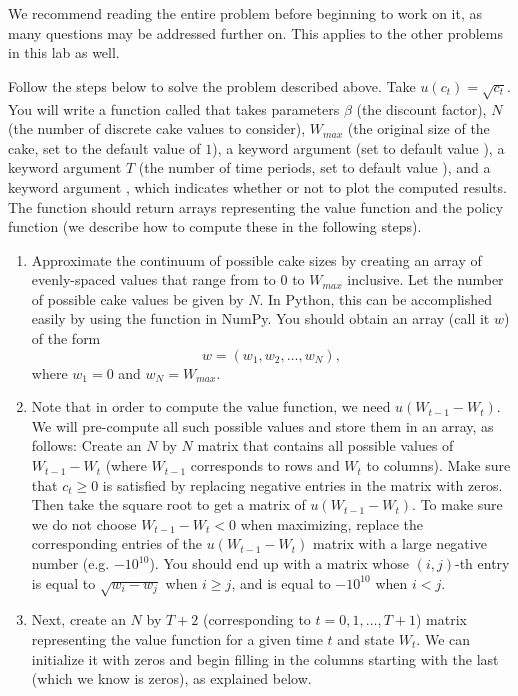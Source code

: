 \begin{problem}
\label{prob:cake_prob}
We recommend reading the entire problem before beginning to work on it, as many questions may be addressed further on.  This applies to the other problems in this lab as well.

Follow the steps below to solve the problem described above.  Take $u(c_t) = \sqrt{c_t}$.
You will write a function called  that takes parameters $\beta$ (the discount factor),
$N$ (the number of discrete cake values to consider), $W_{max}$ (the original size of the cake,
set to the default value of $1$), a keyword argument  (set to default value ),
a keyword argument  $T$ (the number of time periods, set to
default value ), and a keyword argument , which indicates whether or not
to plot the computed results. The function should return arrays representing the value function and the
policy function (we describe how to compute these in the following steps).
\begin{enumerate}
\item Approximate the continuum of possible cake sizes by creating an array
of evenly-spaced values that range from to 0 to $W_{max}$ inclusive.
Let the number of possible cake values be given by $N$. In Python, this can be accomplished easily by
using the  function in NumPy. You should obtain an array (call it $w$) of the form
\[
w = (w_1, w_2, \ldots, w_N),
\]
where $w_1 = 0$ and $w_N = W_{max}$.

\item Note that in order to compute the value function, we need $u(W_{t-1}-W_t)$.
We will pre-compute all such possible values and store them in an array, as follows:
Create an $N$ by $N$ matrix that contains
all possible values of $W_{t-1} - W_t$ (where $W_{t-1}$ corresponds to rows and $W_{t}$ to columns).  Make sure that
$c_t \geq 0$ is satisfied by replacing negative entries in the matrix with zeros.  Then take the square root to get a matrix
of $u(W_{t-1}-W_t)$.  To make sure we do not choose $W_{t-1} - W_t < 0$ when maximizing, replace the corresponding entries of
the $u(W_{t-1}-W_t)$ matrix with a large negative number (e.g. $-10^{10}$). You should end up with a matrix whose
$(i,j)$-th entry is equal to $\sqrt{w_i - w_j}$ when $i \geq j$, and is equal to $-10^{10}$ when $i < j$.

\item Next, create an $N$ by $T+2$ (corresponding to $t=0,1,\ldots, T+1$) matrix representing the value function for a given
time $t$ and state $W_t$.  We can initialize it with zeros and begin filling in the columns starting with the last (which we
know is zeros), as explained below.


\end{enumerate}
\end{problem}
